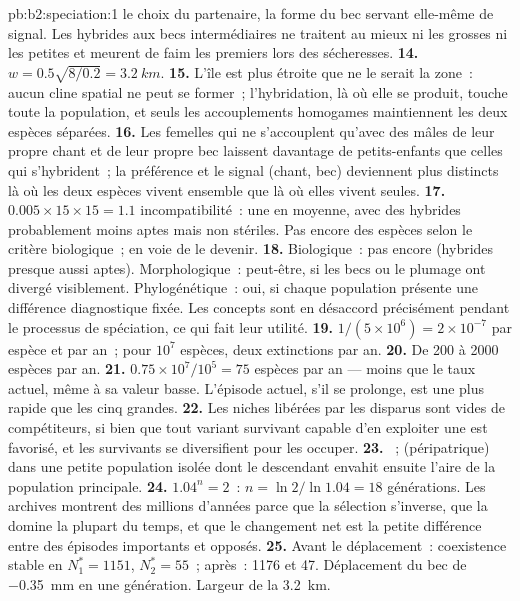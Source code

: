 \begin{solution}{pb:b2:speciation:1}
le choix du partenaire, la forme du bec servant elle-même de signal. Les
hybrides aux becs intermédiaires ne traitent au mieux ni les grosses ni
les petites  et meurent de faim les premiers lors des sécheresses.
\textbf{14.} $w = 0.5\sqrt{8/0.2} = \qty{3.2}{km}$.
\textbf{15.} L'île est plus étroite que ne le serait la zone~: aucun
cline spatial ne peut se former~; l'hybridation, là où elle se produit,
touche toute la population, et seuls les accouplements homogames
maintiennent les deux espèces séparées.
\textbf{16.} Les femelles qui ne s'accouplent qu'avec des mâles de leur
propre chant et de leur propre bec laissent davantage de petits-enfants
que celles qui s'hybrident~; la préférence et le signal (chant, bec)
deviennent plus distincts là où les deux espèces vivent ensemble que là
où elles vivent seules.
\textbf{17.} $0.005\times 15\times 15 = 1.1$ incompatibilité~: une en
moyenne, avec des hybrides probablement moins aptes mais non stériles.
Pas encore des espèces selon le critère biologique~; en voie de le
devenir.
\textbf{18.} Biologique~: pas encore (hybrides presque aussi aptes).
Morphologique~: peut-être, si les becs ou le plumage ont divergé
visiblement. Phylogénétique~: oui, si chaque population présente une
différence diagnostique fixée. Les concepts sont en désaccord précisément
pendant le processus de spéciation, ce qui fait leur utilité.
\textbf{19.} $1/(5\times 10^{6}) = 2\times 10^{-7}$ par espèce et par
an~; pour $10^{7}$ espèces, deux extinctions par an.
\textbf{20.} De 200 à 2000 espèces par an.
\textbf{21.} $0.75\times 10^{7}/10^{5} = 75$ espèces par an --- moins que
le taux actuel, même à sa valeur basse. L'épisode actuel, s'il se
prolonge, est une  plus rapide que les cinq grandes.
\textbf{22.} Les niches libérées par les disparus sont vides de
compétiteurs, si bien que tout variant survivant capable d'en exploiter
une est favorisé, et les survivants se diversifient pour les occuper.
\textbf{23.} ~;  (péripatrique)
dans une petite population isolée dont le descendant envahit ensuite
l'aire de la population principale.
\textbf{24.} $1.04^{n} = 2$~: $n = \ln 2/\ln 1.04 = 18$ générations.
Les archives montrent des millions d'années parce que la sélection
s'inverse, que la  domine la plupart du temps, et
que le changement net est la petite différence entre des épisodes
importants et opposés.
\textbf{25.} Avant le déplacement~: coexistence stable en $N_1^{*} =
1151$, $N_2^{*} = 55$~; après~: 1176 et 47. Déplacement du bec de
\qty{-0.35}{mm} en une génération. Largeur de la  \qty{3.2}{km}.
\end{solution}
